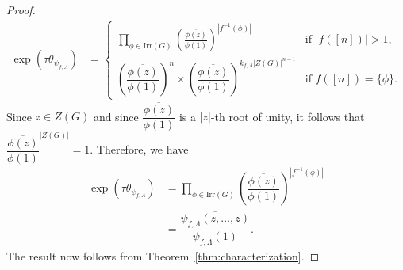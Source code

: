 \documentclass[10pt,a4paper]{amsart}
\newcommand{\irr}{\mathrm{Irr}}
\newcommand{\ov}{\overline}
\begin{document}
\begin{proof}
\begin{align*}
\exp\left( \tau \theta_{\psi_{f,\Lambda}}\right) & = \begin{cases}
\prod\limits_{\phi \in \irr(G)} \left( \frac{\ov{\phi(z)}}{\phi(1)} \right)^{|f^{-1}(\phi)|}  & \text{if $|f([n])|>1$,} \\
\left( \dfrac{\ov{\phi(z)}}{\phi(1)} \right)^{n} \times \left(\dfrac{\ov{\phi(z)}}{\phi(1)}\right)^{k_{f,\Lambda}|Z(G)|^{n-1}} & \text{if $f([n])=\{\phi\}$.}
\end{cases}
\end{align*} 
Since $z \in Z(G)$ and since $\dfrac{\ov{\phi(z)}}{\phi(1)}$ is a $|z|$-th root of unity, it follows that $\dfrac{\ov{\phi(z)}}{\phi(1)}^{|Z(G)|}=1$. Therefore, we have
\begin{align*}
\exp\left( \tau \theta_{\psi_{f,\Lambda}}\right) & = \prod\limits_{\phi \in \irr(G)} \left( \dfrac{\ov{\phi(z)}}{\phi(1)} \right)^{|f^{-1}(\phi)|} \\
&= \dfrac{\ov{\psi_{f,\Lambda}(z,\ldots, z)} }{\psi_{f,\Lambda}(1)}.
\end{align*} 
The result now follows from Theorem~\ref{thm:characterization}.
\end{proof}
\end{document}
